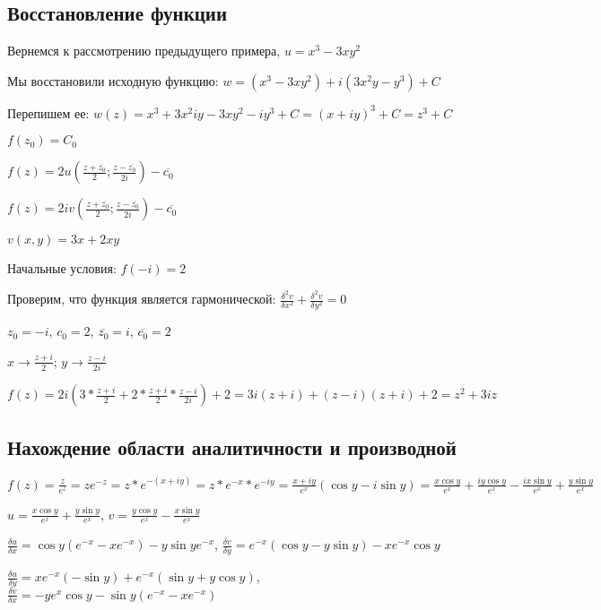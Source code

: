 \documentclass{article}
\begin{document}
\subsection{Восстановление функции}

Вернемся к рассмотрению предыдущего примера, $u = x^3 - 3 x y^2$

Мы восстановили исходную функцию: $w = (x^3 - 3 x y^2) + i (3 x^2 y - y^3) + C$

Перепишем ее: $w (z) = x^3 + 3 x^2 i y - 3 x y^2 - i y^3 + C = (x + i y)^3 + C = z^3 + C$

\hfill

$f(z_0) = C_0$

$f(z) = 2 u (\frac{z + \overline{z_0}}{2} ; \frac{z - \overline{z_0}}{2 i}) - \overline{c_0}$

$f(z) = 2 i v (\frac{z + \overline{z_0}}{2} ; \frac{z - \overline{z_0}}{2 i}) - \overline{c_0}$

\hfill

$v (x, y) = 3 x + 2 x y$

Начальные условия: $f(- i) = 2$

Проверим, что функция является гармонической: $\frac{\delta^2 v}{\delta x^2} + \frac{\delta^2 v}{\delta y^2} = 0$

$z_0 = - i$, $c_0 = 2$, $\overline{z_0} = i$, $\overline{c_0} = 2$

$x \to \frac{z + i}{2}$; $y \to \frac{z - i}{2 i}$

$f(z) = 2 i (3 * \frac{z + i}{2} + 2 * \frac{z + i}{2} * \frac{z - i}{2 i}) + 2 = 3 i (z + i) + (z - i)(z + i) + 2 = z^2 + 3 i z$

\subsection{Нахождение области аналитичности и производной}

$f(z) = \frac{z}{e^{z}} = z e^{-z} = z * e^{- (x + i y)} = z * e^{-x} * e^{-i y} = \frac{x + i y}{e^{x}} (\cos y - i \sin y) = \frac{x \cos y}{e^{x}} + \frac{i y \cos y}{e^{x}} - \frac{i x \sin y}{e^{x}} + \frac{y \sin y}{e^{x}}$

$u = \frac{x \cos y}{e^{x}} + \frac{y \sin y}{e^{x}}$, $v = \frac{y \cos y}{e^{x}} - \frac{x \sin y}{e^{x}}$

$\frac{\delta u}{\delta x} = \cos y (e^{-x} - x e^{-x}) - y \sin y e^{- x}$, $\frac{\delta v}{\delta y} = e^{-x} (\cos y - y \sin y) - x e^{-x} \cos y$

$\frac{\delta u}{\delta y} = x e^{-x} (- \sin y) + e^{-x} (\sin y + y \cos y)$, $\frac{\delta v}{\delta x} = - y e^{x} \cos y - \sin y (e^{-x} - x e^{-x})$
\end{document}
